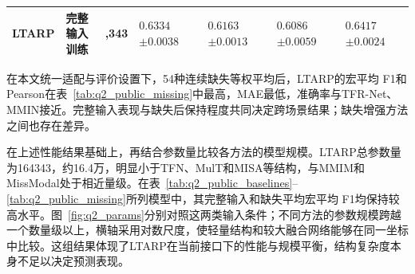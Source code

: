 \begin{table}[!htbp]
\begin{tabularx}{\textwidth}{@{}>{\raggedright\arraybackslash}p{2.0cm}>{\centering\arraybackslash}p{2.5cm}>{\centering\arraybackslash}p{2.1cm}*{4}{>{\centering\arraybackslash}X}@{}}
\addlinespace\midrule
LTARP & \shortstack{完整输入\\训练} & 164,343 & \shortstack{$0.6334$\\$\pm0.0038$} & \shortstack{$0.6163$\\$\pm0.0013$} & \shortstack{$0.6086$\\$\pm0.0059$} & \shortstack{$0.6417$\\$\pm0.0024$}\\
\bottomrule
\end{tabularx}
\par\vspace{10bp}\begin{minipage}{\textwidth}\songti\normalsize\setlength{\parindent}{2em}
\QTwoParagraph 在本文统一适配与评价设置下，54种连续缺失等权平均后，LTARP的宏平均 F1和Pearson在表~\ref{tab:q2_public_missing}中最高，MAE最低，准确率与TFR-Net、MMIN接近。完整输入表现与缺失后保持程度共同决定跨场景结果；缺失增强方法之间也存在差异。

\QTwoParagraph 在上述性能结果基础上，再结合参数量比较各方法的模型规模。LTARP总参数量为164343，约16.4万，明显小于TFN、MulT和MISA等结构，与MMIM和MissModal处于相近量级。在表~\ref{tab:q2_public_baselines}--\ref{tab:q2_public_missing}所列模型中，其完整输入和缺失平均宏平均 F1均保持较高水平。图~\ref{fig:q2_params}分别对照这两类输入条件；不同方法的参数规模跨越一个数量级以上，横轴采用对数尺度，使轻量结构和较大融合网络能够在同一坐标中比较。这组结果体现了LTARP在当前接口下的性能与规模平衡，结构复杂度本身不足以决定预测表现。
\end{minipage}
\end{table}